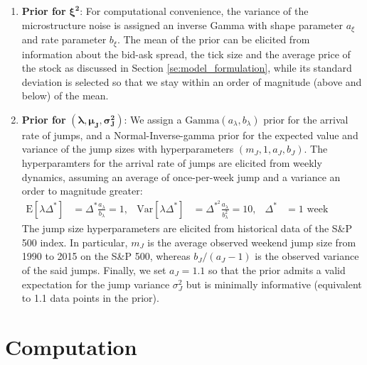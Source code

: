 \documentclass[10pt]{article}
\newcommand{\E}[1]{\mbox{E}\left[#1\right]}
\newcommand{\Var}[1]{\mbox{Var}\left[#1\right]}
\begin{document}
\begin{enumerate}[]

\item{\textbf{Prior for} $\boldsymbol{\xi^2}$:}  For computational convenience, the variance of the microstructure noise is assigned an inverse Gamma with shape parameter $a_{\xi}$ and rate parameter $b_{\xi}$.  The mean of the prior can be elicited from information about the bid-ask spread, the tick size and the average price of the stock as discussed in Section \ref{se:model_formulation}, while its standard deviation is selected so that we stay within an order of magnitude (above and below) of the mean.


\item{\textbf{Prior for} $(\boldsymbol{\lambda}, \boldsymbol{\mu_J}, \boldsymbol{\sigma^2_J})$:} We assign a $\mbox{Gamma}(a_\lambda,b_\lambda)$ prior for the arrival rate of jumps, and a Normal-Inverse-gamma prior for the expected value and variance of the jump sizes with hyperparameters $(m_J, 1, a_J, b_J)$. The hyperparamters for the arrival rate of jumps are elicited from weekly dynamics, assuming an average of once-per-week jump and a variance an order to magnitude greater:
  \begin{align}
    \E{\lambda \Delta^*} &= \Delta^* \frac{a_\lambda}{b_\lambda} = 1, & \Var{\lambda \Delta^*} &= \Delta^*^2 \frac{a_\lambda}{b_\lambda^2} = 10, & \Delta^* &= 1 \mbox{ week (milliseconds).}
  \end{align}
  The jump size hyperparameters are elicited from historical data of the S\&P 500 index. In particular, $m_J$ is the average observed weekend jump size from 1990 to 2015 on the S\&P 500, whereas $b_J/(a_J-1)$ is the observed  variance of the said jumps. Finally, we set $a_J = 1.1$ so that the prior admits a valid expectation for the jump variance $\sigma_J^2$ but is minimally informative (equivalent to 1.1 data points in the prior).

\end{enumerate}


\section{Computation}\label{se:computation}
\end{document}
